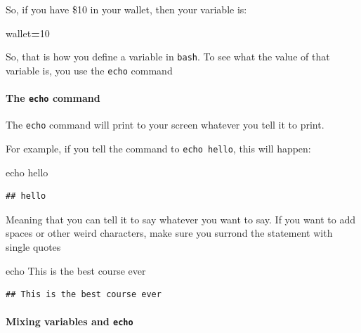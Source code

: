 \documentclass[
]{book}
\newenvironment{Shaded}{\begin{snugshade}}{\end{snugshade}}
\newcommand{\BuiltInTok}[1]{#1}
\newcommand{\NormalTok}[1]{#1}
\newcommand{\OperatorTok}[1]{\textcolor[rgb]{0.81,0.36,0.00}{\textbf{#1}}}
\newcommand{\StringTok}[1]{\textcolor[rgb]{0.31,0.60,0.02}{#1}}
\newcommand{\VariableTok}[1]{\textcolor[rgb]{0.00,0.00,0.00}{#1}}
\begin{document}
So, if you have \$10 in your wallet, then your variable is:

\begin{Shaded}
\begin{Highlighting}[]
\VariableTok{wallet}\OperatorTok{=}\NormalTok{10}
\end{Highlighting}
\end{Shaded}

So, that is how you define a variable in \texttt{bash}. To see what the value of that variable is, you use the \texttt{echo} command

\hypertarget{the-echo-command}{%
\paragraph{\texorpdfstring{The \texttt{echo} command}{The echo command}}\label{the-echo-command}}

The \texttt{echo} command will print to your screen whatever you tell it to print.

For example, if you tell the command to \texttt{echo\ \textquotesingle{}hello\textquotesingle{}}, this will happen:

\begin{Shaded}
\begin{Highlighting}[]
\BuiltInTok{echo} \StringTok{\textquotesingle{}hello\textquotesingle{}}
\end{Highlighting}
\end{Shaded}

\begin{verbatim}
## hello
\end{verbatim}

Meaning that you can tell it to say whatever you want to say. If you want to add spaces or other weird characters, make sure you surrond the statement with single quotes

\begin{Shaded}
\begin{Highlighting}[]
\BuiltInTok{echo} \StringTok{\textquotesingle{}This is the best course ever\textquotesingle{}}
\end{Highlighting}
\end{Shaded}

\begin{verbatim}
## This is the best course ever
\end{verbatim}

\hypertarget{mixing-variables-and-echo}{%
\paragraph{\texorpdfstring{Mixing variables and \texttt{echo}}{Mixing variables and echo}}\label{mixing-variables-and-echo}}
\end{document}

